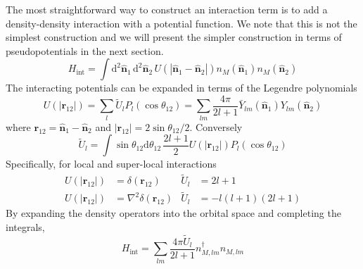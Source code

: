 \documentclass{timesjhep}
\begin{document}
The most straightforward way to construct an interaction term is to add a density-density interaction with a potential function. We note that this is not the simplest construction and we will present the simpler construction in terms of pseudopotentials in the next section. 
\begin{equation}
    H_\mathrm{int}=\int\mathrm{d}^2\hat{\mathbf{n}}_1\,\mathrm{d}^2\hat{\mathbf{n}}_2\,U(|\hat{\mathbf{n}}_1-\hat{\mathbf{n}}_2|)n_M(\hat{\mathbf{n}}_1)n_M(\hat{\mathbf{n}}_2) 
\end{equation} 
The interacting potentials can be expanded in terms of the Legendre polynomials 
\begin{equation}
    U(|\mathbf{r}_{12}|)=\sum_l\tilde{U}_lP_l(\cos\theta_{12})=\sum_{lm}\frac{4\pi}{2l+1}\bar{Y}_{lm}(\hat{\mathbf{n}}_1)Y_{lm}(\hat{\mathbf{n}}_2)
\end{equation} 
where $\mathbf{r}_{12}=\hat{\mathbf{n}}_1-\hat{\mathbf{n}}_2$ and $|\mathbf{r}_{12}|=2\sin\theta_{12}/2$. Conversely 
\begin{equation}
    \tilde{U}_l=\int\sin\theta_{12}\mathrm{d}\theta_{12}\,\frac{2l+1}{2}U(|\mathbf{r}_{12}|)P_l(\cos\theta_{12})
\end{equation} 
Specifically, for local and super-local interactions 
\begin{align}
    U(|\mathbf{r}_{12}|)&=\delta(\mathbf{r}_{12})&\tilde{U}_l&=2l+1\nonumber\\
    U(|\mathbf{r}_{12}|)&=\nabla^2\delta(\mathbf{r}_{12})&\tilde{U}_l&=-l(l+1)(2l+1)     
\end{align}
By expanding the density operators into the orbital space and completing the integrals, 
\begin{equation}
    H_\mathrm{int}=\sum_{lm}\frac{4\pi \tilde{U}_l}{2l+1}n^\dagger_{M,lm}n_{M,lm}
\end{equation} 
\end{document}
